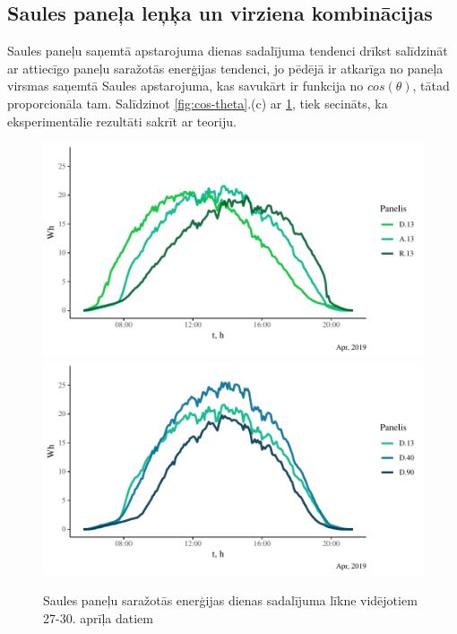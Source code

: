 \subsection{Saules paneļa leņķa un virziena kombinācijas}
\label{subsection:month_day}

Saules paneļu saņemtā apstarojuma dienas sadalījuma tendenci drīkst salīdzināt ar attiecīgo paneļu saražotās enerģijas tendenci, jo pēdējā ir atkarīga no paneļa virsmas saņemtā Saules apstarojuma, kas savukārt ir funkcija no $cos(\theta)$, tātad proporcionāla tam. Salīdzinot \ref{fig:cos-theta}.(c) ar 
\ref{fig:toldU}, tiek secināts, ka eksperimentālie rezultāti sakrīt ar teoriju.

\begin{figure}[h]
    \centering
    \includegraphics[width=\linewidth]{figures/sol_day/apr_LG_13.pdf}
    \includegraphics[width=\linewidth]{figures/sol_day/apr_LG_D.pdf}
    \caption{Saules paneļu saražotās enerģijas dienas sadalījuma līkne vidējotiem 27-30. aprīļa datiem} \label{fig:toldU}
\end{figure}


